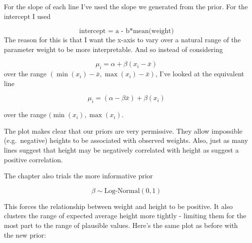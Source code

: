 \documentclass[
]{book}
\begin{document}
For the slope of each line I've used the slope we generated from the prior. For the intercept I used

\[
\text{intercept = a - b*mean(weight)}
\]
The reason for this is that I want the x-axis to vary over a natural range of the parameter weight to be more interpretable. And so instead of considering

\[
\mu_i = \alpha + \beta(x_i - \bar{x}) 
\]
over the range \((\min( x_i) - \bar{x},\max( x_i) - \bar{x})\), I've looked at the equivalent line

\[
\mu_i = (\alpha - \beta\bar{x}) + \beta(x_i ) 
\]

over the range \((\min( x_i),\max( x_i)\).

The plot makes clear that our priors are very permissive. They allow impossible (e.g.~negative) heights to be associated with observed weights. Also, just as many lines suggest that height may be negatively correlated with height as suggest a positive correlation.

The chapter also trials the more informative prior

\[
\beta \sim \text{Log-Normal}(0,1)
\]

This forces the relationship between weight and height to be positive. It also clusters the range of expected average height more tightly - limiting them for the most part to the range of plausible values. Here's the same plot as before with the new prior:
\end{document}
